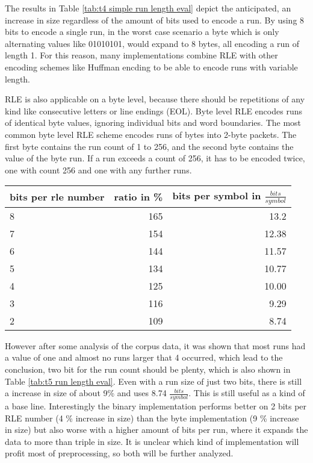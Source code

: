 \par{
The results in Table \ref{tab:t4 simple run length eval} depict the anticipated, an increase in size regardless of the amount of bits used to encode a run. By using 8 bits to encode a single run, in the worst case scenario a byte which is only alternating values like 01010101, would expand to 8 bytes, all encoding a run of length 1. For this reason, many implementations combine RLE with other encoding schemes like Huffman encding to be able to encode runs with variable length.
}

\par{
RLE is also applicable on a byte level, because there should be repetitions of any kind like consecutive letters or line endings (EOL). Byte level RLE encodes runs of identical byte values, ignoring individual bits and word boundaries. The most common byte level RLE scheme encodes runs of bytes into 2-byte packets. The first byte contains the run count of 1 to 256, and the second byte contains the value of the byte run. If a run exceeds a count of 256, it has to be encoded twice, one with count 256 and one with any further runs.
}

\begin{center}
	\begin{tabular}[p]{l|r|r}
		\label{tab:t5 run length eval}
		
		bits per rle number &  ratio in \% & bits per symbol in $\frac{bits}{symbol}$\\
		\hline
		8 & 165 & 13.2 \\
		7 & 154 & 12.38\\
		6 & 144 & 11.57 \\
		5 & 134 & 10.77\\
		4 & 125 & 10.00\\
		3 & 116 & 9.29\\
		2 & 109 & 8.74 \\
	\end{tabular}
\end{center}


\par{
 However after some analysis of the corpus data, it was shown that most runs had a value of one and almost no runs larger that 4 occurred, which lead to the conclusion, two bit for the run count should be plenty, which is also shown in Table \ref{tab:t5 run length eval}.
 Even with a run size of just two bits, there is still a increase in size of about 9\% and uses 8.74 $\frac{bits}{symbol}$. This is still useful as a kind of a base line.
Interestingly the binary implementation performs better on 2 bits per RLE number (4 \% increase in size) than the byte implementation (9 \% increase in size) but also worse with a higher amount of bits per run, where it expands the data to more than triple in size. It is unclear which kind of implementation will profit most of preprocessing, so both will be further analyzed.
}

